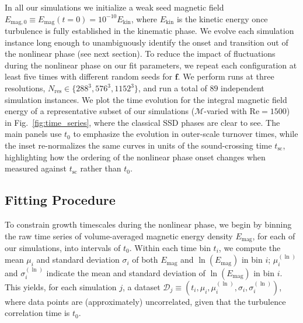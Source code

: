 \documentclass[12pt,twoside]{extreport}
\makeatletter
\newcommand{\mVector}[1]{\bm{#1}} %
\newcommand{\mReh}{\ensuremath{\mathrm{Re}}} %
\newcommand{\mSonicMach}{\ensuremath{\mathcal{M}}} %
\providecommand{\DIFaddtex}[1]{{\protect\color{DIFgreen}\uwave{#1}}} %
\providecommand{\DIFdeltex}[1]{{\protect\color{DIFpurple}\sout{#1}}} %
\providecommand{\DIFaddbegin}{} %
\providecommand{\DIFaddend}{} %
\providecommand{\DIFdelbegin}{} %
\providecommand{\DIFdelend}{} %
\providecommand{\DIFadd}[1]{\texorpdfstring{\DIFaddtex{#1}}{#1}} %
\providecommand{\DIFdel}[1]{\texorpdfstring{\DIFdeltex{#1}}{}} %
\providecommand{\DIFscaledelfig}{0.5}
\newlength{\DIFdelgraphicswidth} %
\newlength{\DIFdelgraphicsheight} %
\providecommand{\DIFaddincludegraphics}[2][]{{\color{DIFgreen}\fbox{\DIFOincludegraphics[#1]{#2}}}} %
\providecommand{\DIFdelincludegraphics}[2][]{%
\sbox{\DIFdelgraphicsbox}{\DIFOincludegraphics[#1]{#2}}%
\settoboxwidth{\DIFdelgraphicswidth}{\DIFdelgraphicsbox} %
\settoboxtotalheight{\DIFdelgraphicsheight}{\DIFdelgraphicsbox} %
\scalebox{\DIFscaledelfig}{%
\parbox[b]{\DIFdelgraphicswidth}{\usebox{\DIFdelgraphicsbox}\\[-\baselineskip] \rule{\DIFdelgraphicswidth}{0em}}\llap{\resizebox{\DIFdelgraphicswidth}{\DIFdelgraphicsheight}{%
\setlength{\unitlength}{\DIFdelgraphicswidth}%
\begin{picture}(1,1)%
\thicklines\linethickness{2pt} %
{\color{DIFpurple}\put(0,0){\framebox(1,1){}}}%
{\color{DIFpurple}\put(0,0){\line( 1,1){1}}}%
{\color{DIFpurple}\put(0,1){\line(1,-1){1}}}%
\end{picture}%
}\hspace*{3pt}}} %
} %
\DeclareRobustCommand{\DIFaddbegin}{\DIFOaddbegin \let\includegraphics\DIFaddincludegraphics} %
\DeclareRobustCommand{\DIFaddend}{\DIFOaddend \let\includegraphics\DIFOincludegraphics} %
\DeclareRobustCommand{\DIFdelbegin}{\DIFOdelbegin \let\includegraphics\DIFdelincludegraphics} %
\DeclareRobustCommand{\DIFdelend}{\DIFOaddend \let\includegraphics\DIFOincludegraphics} %
\let\sout@orig\sout %
\renewcommand{\sout}[1]{\ifmmode\text{\sout@orig{\ensuremath{#1}}}\else\sout@orig{#1}\fi} %
\makeatother
\begin{document}
    In all our simulations we initialize a weak seed magnetic field $E_{\mathrm{mag}, 0} \equiv E_\mathrm{mag}(t=0) = 10^{-10} E_\mathrm{kin}$, where $E_\mathrm{kin}$ is the kinetic energy once turbulence is fully established in the kinematic phase. We evolve each simulation instance long enough to unambiguously identify the onset and transition out of the nonlinear phase (see next section). To reduce the impact of fluctuations during the nonlinear phase on our fit parameters, we repeat each configuration at least five times with different random seeds for $\mVector{f}$. We perform runs at three resolutions, $N_\mathrm{res} \in \{288^3, 576^3, 1152^3\}$, and run a total of $89$ independent simulation instances. We plot the time evolution for the integral magnetic field energy of a representative subset of our simulations ($\mSonicMach$-varied with $\mReh = 1500$) in Fig.~\ref{fig:time_series}, where the classical SSD phases are clear to see. The main panels use \DIFdelbegin \DIFdel{$t_0$ }\DIFdelend \DIFaddbegin \DIFadd{$t_\mathrm{turb}$ }\DIFaddend to emphasize the evolution in outer-scale turnover times, while the inset re-normalizes the same curves in units of the sound-crossing time $t_\mathrm{sc}$, highlighting how the ordering of the nonlinear phase onset changes when measured against $t_\mathrm{sc}$ rather than \DIFdelbegin \DIFdel{$t_0$}\DIFdelend \DIFaddbegin \DIFadd{$t_\mathrm{turb}$}\DIFaddend .

\subsection{Fitting Procedure} \label{sec:methods:fitting}

    To constrain growth timescales during the nonlinear phase, we begin by binning the raw time series of volume-averaged magnetic energy density $E_\mathrm{mag}$, for each of our simulations, into intervals of \DIFdelbegin \DIFdel{$t_0$}\DIFdelend \DIFaddbegin \DIFadd{$t_\mathrm{turb}$}\DIFaddend . Within each time bin $t_i$, we compute the mean $\mu_i$ and standard deviation $\sigma_i$ of both $E_\mathrm{mag}$ and $\ln(E_\mathrm{mag})$ in bin $i$; $\mu_i^{(\ln)}$ and $\sigma_i^{(\ln)}$ indicate the mean and standard deviation of $\ln(E_\mathrm{mag})$ in bin $i$. This yields, for each simulation $j$, a dataset $\mVector{\mathcal{D}}_j \equiv (t_i, \mu_i, \mu_i^{(\ln)}, \sigma_{i}, \sigma_i^{(\ln)})$, where data points are (approximately) uncorrelated, given that the turbulence correlation time is \DIFdelbegin \DIFdel{$t_0$}\DIFdelend \DIFaddbegin \DIFadd{$t_\mathrm{turb}$}\DIFaddend .
\end{document}
